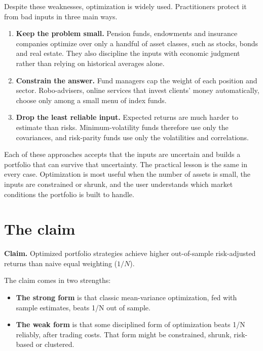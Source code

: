 Despite these weaknesses, optimization is widely used. Practitioners protect it from bad inputs in three main ways.

\begin{enumerate}
  \item \textbf{Keep the problem small.} Pension funds, endowments and insurance companies optimize over only a handful of asset classes, such as stocks, bonds and real estate. They also discipline the inputs with economic judgment rather than relying on historical averages alone.
  \item \textbf{Constrain the answer.} Fund managers cap the weight of each position and sector. Robo-advisers, online services that invest clients' money automatically, choose only among a small menu of index funds.
  \item \textbf{Drop the least reliable input.} Expected returns are much harder to estimate than risks. Minimum-volatility funds therefore use only the covariances, and risk-parity funds use only the volatilities and correlations.
\end{enumerate}

Each of these approaches accepts that the inputs are uncertain and builds a portfolio that can survive that uncertainty. The practical lesson is the same in every case. Optimization is most useful when the number of assets is small, the inputs are constrained or shrunk, and the user understands which market conditions the portfolio is built to handle.


\section{The claim}
\label{sec:12-claim}

\begin{callout}
\textbf{Claim.} Optimized portfolio strategies achieve higher out-of-sample risk-adjusted returns than naive equal weighting ($1/N$).
\end{callout}

The claim comes in two strengths:

\begin{itemize}
  \item \textbf{The strong form} is that classic mean-variance optimization, fed with sample estimates, beats 1/N out of sample.
  \item \textbf{The weak form} is that some disciplined form of optimization beats 1/N reliably, after trading costs. That form might be constrained, shrunk, risk-based or clustered.
\end{itemize}

